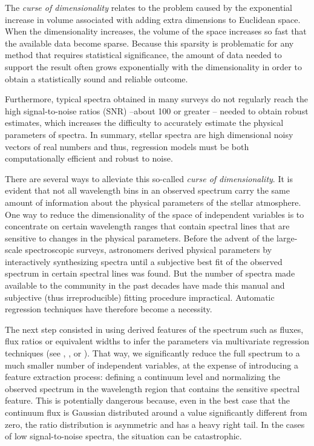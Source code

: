 \documentclass[a4paper,fleqn,usenatbib]{mnras}
\begin{document}
The \textit{curse of dimensionality} \citep{bellman:61} relates to 
the problem caused by the exponential increase in volume associated 
with adding extra dimensions to Euclidean space. 
When the dimensionality increases, the volume of the space increases so 
fast that the available data become sparse. Because this sparsity is 
problematic for any method that requires statistical significance, the 
amount of data needed to support the result often grows exponentially 
with the dimensionality in order to obtain a statistically sound and 
reliable outcome.

Furthermore, typical spectra obtained in many surveys do not 
regularly reach the high signal-to-noise ratios (SNR) --about
100 or greater -- needed to obtain robust estimates, which
increases the difficulty to accurately estimate the physical
parameters of spectra.  In summary, stellar spectra are high
dimensional noisy vectors of real numbers and thus,
regression models must be both computationally efficient and robust
to noise.

There are several ways to alleviate this so-called \textit{curse of
  dimensionality}. It is evident that not all wavelength bins in an
observed spectrum carry the same amount of information about the
physical parameters of the stellar atmosphere. One way to reduce the
dimensionality of the space of independent variables is to concentrate
on certain wavelength ranges that contain spectral lines that are
sensitive to changes in the physical parameters. Before the
advent of the large-scale spectroscopic surveys, astronomers derived
physical parameters by interactively synthesizing spectra until a
subjective best fit of the observed spectrum in certain spectral lines
was found. But the number of spectra made available to the community
in the past decades have made this manual and subjective (thus
irreproducible) fitting procedure impractical. Automatic regression
techniques have therefore become a necessity.

The next step consisted in using derived features of the spectrum such
as fluxes, flux ratios or equivalent widths to infer the parameters
via multivariate regression techniques (see
\cite{2006ApJ...636..804A}, \cite{2012ApJ...750L..37M}, or
\cite{2006A&A...456.1109M}). That way, we significantly reduce the
full spectrum to a much smaller number of independent variables, at
the expense of introducing a feature extraction process: defining a
continuum level and normalizing the observed spectrum in the
wavelength region that contains the sensitive spectral feature. This
is potentially dangerous because, even in the best case that the
continuum flux is Gaussian distributed around a value significantly
different from zero, the ratio distribution is asymmetric and has a
heavy right tail. In the cases of low signal-to-noise spectra, the
situation can be catastrophic.
\end{document}
